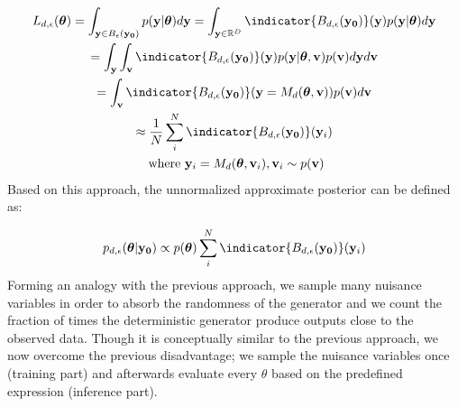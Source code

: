 \begin{gather} \label{eq:alt_view}
  L_{d, \epsilon}(\thetab) =
  \int_{\yb \in B_\epsilon(\data)}p(\yb|\thetab)d\yb =
  \int_{\yb \in \R^D} \indicator{\region(\data)}(\yb) p(\yb|\thetab)d\yb\\
  = \int_\yb \int_\vb \indicator{\region(\data)}(\yb) p(\yb|\thetab, \vb) p(\vb) d\yb d\vb \\
  = \int_\vb \indicator{\region(\data)}(\yb=M_d(\thetab, \vb)) p(\vb) d\vb \\
  \approx \frac{1}{N} \sum_i^N \indicator{\region (\data)} (\yb_i) \\
  \text{ where } \yb_i = M_d(\thetab, \vb_i), \vb_i \sim p(\vb)
\end{gather}
%
Based on this approach, the unnormalized approximate posterior can be
defined as:

\begin{equation} \label{eq:aprox_posterior}
  p_{d,\epsilon}(\thetab|\data)
  \propto p(\thetab) \sum_i^N \indicator{ \region(\data)} (\yb_i)
\end{equation}
%
Forming an analogy with the previous approach, we sample many nuisance
variables in order to absorb the randomness of the generator and we
count the fraction of times the deterministic generator produce
outputs close to the observed data. Though it is conceptually similar
to the previous approach, we now overcome the previous disadvantage;
we sample the nuisance variables once (training part) and afterwards
evaluate every $\theta$ based on the predefined expression (inference
part).
